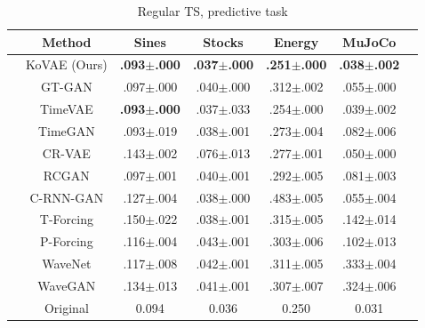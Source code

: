 \documentclass{article} %
\begin{document}
\begin{table}[ht]
    \centering
    \caption{Regular TS, predictive task}
    \label{tab:regular_predictive_app}
    \begin{tabular}{ccccccc}
        \toprule
         & Method    & Sines & Stocks & Energy & MuJoCo  \\ 
        \midrule
        & KoVAE (Ours) & \cellcolor{blue!10}\textbf{.093$\pm$.000} & \cellcolor{blue!10}\textbf{.037$\pm$.000} & \cellcolor{blue!10}\textbf{.251$\pm$.000} & \cellcolor{blue!10}\textbf{.038$\pm$.002}\\  
        \midrule
        & GT-GAN    & .097$\pm$.000  &  .040$\pm$.000  & .312$\pm$.002    & .055$\pm$.000    \\
        & TimeVAE   &\cellcolor{blue!10}\textbf{ .093$\pm$.000}   &  .037$\pm$.033   & .254$\pm$.000  &  .039$\pm$.002       \\ 
        & TimeGAN   & .093$\pm$.019    & .038$\pm$.001   &   .273$\pm$.004   & .082$\pm$.006     \\  
        & CR-VAE    & .143$\pm$.002  & .076$\pm$.013   & .277$\pm$.001  & .050$\pm$.000  \\
        & RCGAN     & .097$\pm$.001  & .040$\pm$.001  & .292$\pm$.005 & .081$\pm$.003 \\
        & C-RNN-GAN & .127$\pm$.004  & .038$\pm$.000  & .483$\pm$.005 & .055$\pm$.004 \\
        & T-Forcing & .150$\pm$.022  & .038$\pm$.001  & .315$\pm$.005 & .142$\pm$.014 \\ 
        & P-Forcing & .116$\pm$.004  & .043$\pm$.001  & .303$\pm$.006 & .102$\pm$.013 \\  
        & WaveNet   & .117$\pm$.008  & .042$\pm$.001  & .311$\pm$.005 & .333$\pm$.004 \\ 
        & WaveGAN   & .134$\pm$.013  & .041$\pm$.001  & .307$\pm$.007 & .324$\pm$.006 \\
        \midrule
        & Original  & 0.094  & 0.036  & 0.250  &  0.031     \\ 
        \bottomrule
    \end{tabular}
\end{table}




\end{document}
